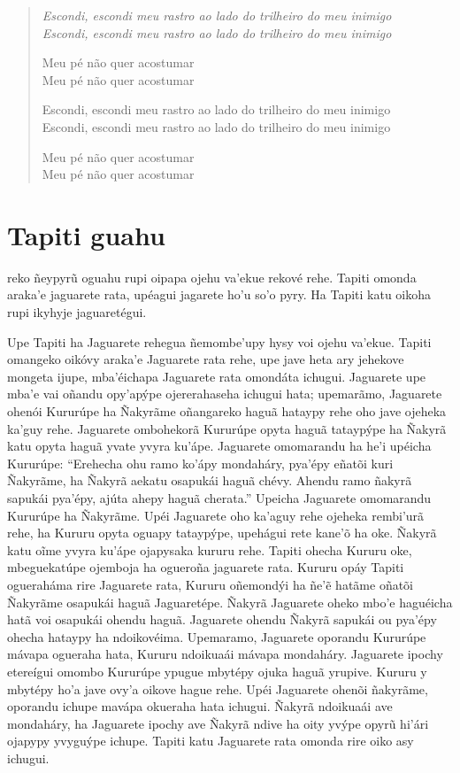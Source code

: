 \begin{verse}
\itshape
Escondi, escondi meu rastro ao lado do trilheiro do \qb{}meu inimigo\\
Escondi, escondi meu rastro ao lado do trilheiro do \qb{}meu inimigo

Meu pé não quer acostumar\\
Meu pé não quer acostumar

Escondi, escondi meu rastro ao lado do trilheiro do \qb{}meu inimigo\\
Escondi, escondi meu rastro ao lado do trilheiro do \qb{}meu inimigo

Meu pé não quer acostumar\\
Meu pé não quer acostumar
\end{verse}

\chapter{Tapiti guahu}

 reko ñeypyrũ oguahu rupi oipapa ojehu va'ekue rekové rehe. Tapiti
omonda araka'e jaguarete rata, upéagui jagarete ho'u so'o pyry. Ha
Tapiti katu oikoha rupi ikyhyje jaguaretégui.

Upe Tapiti ha Jaguarete rehegua ñemombe'upy hysy voi ojehu va'ekue.
Tapiti omangeko oikóvy araka'e Jaguarete rata rehe, upe jave heta ary
jehekove mongeta ijupe, mba'éichapa Jaguarete rata omondáta ichugui.
Jaguarete upe mba'e vai oñandu opy'apýpe ojererahaseha ichugui hata;
upemarãmo, Jaguarete ohenói Kururúpe ha Ñakyrãme oñangareko haguã
hataypy rehe oho jave ojeheka ka'guy rehe. Jaguarete ombohekorã Kururúpe
opyta haguã tataypýpe ha Ñakyrã katu opyta haguã yvate yvyra ku'ápe.
Jaguarete omomarandu ha he'i upéicha Kururúpe: ``Erehecha ohu ramo
ko'ápy mondaháry, pya'épy eñatõi kuri Ñakyrãme, ha Ñakyrã aekatu
osapukái haguã chévy. Ahendu ramo ñakyrã sapukái pya'épy, ajúta ahepy
haguã cherata.'' Upeicha Jaguarete omomarandu Kururúpe ha Ñakyrãme. Upéi
Jaguarete oho ka'aguy rehe ojeheka rembi'urã rehe, ha Kururu opyta
oguapy tataypýpe, upehágui rete kane'õ ha oke. Ñakyrã katu oĩme yvyra
ku'ápe ojapysaka kururu rehe. Tapiti ohecha Kururu oke, mbeguekatúpe
ojemboja ha ogueroña jaguarete rata. Kururu opáy Tapiti ogueraháma rire
Jaguarete rata, Kururu oñemondýi ha ñe'ẽ hatãme oñatõi Ñakyrãme osapukái
haguã Jaguaretépe. Ñakyrã Jaguarete oheko mbo'e haguéicha hatã voi
osapukái ohendu haguã. Jaguarete ohendu Ñakyrã sapukái ou pya'épy ohecha
hataypy ha ndoikovéima. Upemaramo, Jaguarete oporandu Kururúpe mávapa
ogueraha hata, Kururu ndoikuaái mávapa mondaháry. Jaguarete ipochy
etereígui omombo Kururúpe ypugue mbytépy ojuka haguã yrupive. Kururu y
mbytépy ho'a jave ovy'a oikove hague rehe. Upéi Jaguarete ohenõi
ñakyrãme, oporandu ichupe mavápa okueraha hata ichugui. Ñakyrã ndoikuaái
ave mondaháry, ha Jaguarete ipochy ave Ñakyrã ndive ha oity yvýpe opyrũ
hi'ári ojapypy yvyguýpe ichupe. Tapiti katu Jaguarete rata omonda rire
oiko asy ichugui.


